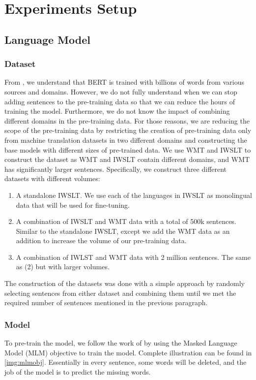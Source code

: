 \section{Experiments Setup}
\subsection{Language Model}
\label{ssec:langmodel}
\subsubsection{Dataset}
From \cite{devlin2018bert}, we understand that BERT is trained with billions of words from various sources and domains. However, we do not fully understand when we can stop adding sentences to the pre-training data so that we can reduce the hours of training the model. Furthermore, we do not know the impact of combining different domains in the pre-training data. For those reasons, we are reducing the scope of the pre-training data by restricting the creation of pre-training data only from machine translation datasets in two different domains and constructing the base models with different sizes of pre-trained data. We use WMT and IWSLT to construct the dataset as WMT and IWSLT contain different domains, and WMT has significantly larger sentences. Specifically, we construct three different datasets with different volumes:
\begin{enumerate}
    \item A standalone IWSLT. We use each of the languages in IWSLT as monolingual data that will be used for fine-tuning.
    \item A combination of IWSLT and WMT data with a total of 500k sentences. Similar to the standalone IWSLT, except we add the WMT data as an addition to increase the volume of our pre-training data.
    \item A combination of IWLST and WMT data with 2 million sentences. The same as (2) but with larger volumes.
\end{enumerate}

The construction of the datasets was done with a simple approach by randomly selecting sentences from either dataset and combining them until we met the required number of sentences mentioned in the previous paragraph.

\subsubsection{Model}
To pre-train the model, we follow the work of \cite{devlin2018bert} by using the Masked Language Model (MLM) objective to train the model. Complete illustration can be found in \cref{img:mlmobj}. Essentially in every sentence, some words will be deleted, and the job of the model is to predict the missing words.

